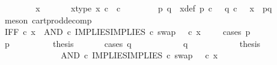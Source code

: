 \begin{isabellebody}
\ \ \isamarkupfalse%
{\isacharminus}{\kern0pt}\isanewline
\ \ \ \ \isamarkupfalse%
\ x\ \isanewline
\ \ \ \ \isamarkupfalse%
\ x{\isacharunderscore}{\kern0pt}type{\isacharcolon}{\kern0pt}\ {\isachardoublequoteopen}x\ {\isasymin}\isactrlsub c\ {\isasymOmega}\ {\isasymtimes}\isactrlsub c\ {\isasymOmega}{\isachardoublequoteclose}\isanewline
\ \ \ \ \isamarkupfalse%
\ \isamarkupfalse%
\ p\ q\ \ x{\isacharunderscore}{\kern0pt}def{\isacharcolon}{\kern0pt}\ {\isachardoublequoteopen}p\ {\isasymin}\isactrlsub c\ {\isasymOmega}\ {\isasymand}\ q\ {\isasymin}\isactrlsub c\ {\isasymOmega}\ {\isasymand}\ x\ {\isacharequal}{\kern0pt}\ {\isasymlangle}p{\isacharcomma}{\kern0pt}q{\isasymrangle}{\isachardoublequoteclose}\isanewline
\ \ \ \ \ \ \isamarkupfalse%
\ {\isacharparenleft}{\kern0pt}meson\ cart{\isacharunderscore}{\kern0pt}prod{\isacharunderscore}{\kern0pt}decomp{\isacharparenright}{\kern0pt}\isanewline
\ \ \ \ \isamarkupfalse%
\ {\isachardoublequoteopen}IFF\ {\isasymcirc}\isactrlsub c\ x\ {\isacharequal}{\kern0pt}\ {\isacharparenleft}{\kern0pt}AND\ {\isasymcirc}\isactrlsub c\ {\isasymlangle}IMPLIES{\isacharcomma}{\kern0pt}IMPLIES\ {\isasymcirc}\isactrlsub c\ swap\ {\isasymOmega}\ {\isasymOmega}{\isasymrangle}{\isacharparenright}{\kern0pt}\ {\isasymcirc}\isactrlsub c\ x{\isachardoublequoteclose}\isanewline
\ \ \ \ \isamarkupfalse%
{\isacharparenleft}{\kern0pt}cases\ {\isachardoublequoteopen}p\ {\isacharequal}{\kern0pt}\ {\isasymt}{\isachardoublequoteclose}{\isacharparenright}{\kern0pt}\isanewline
\ \ \ \ \ \ \isamarkupfalse%
\ {\isachardoublequoteopen}p\ {\isacharequal}{\kern0pt}\ {\isasymt}{\isachardoublequoteclose}\isanewline
\ \ \ \ \ \ \isamarkupfalse%
\ {\isacharquery}{\kern0pt}thesis\isanewline
\ \ \ \ \ \ \isamarkupfalse%
{\isacharparenleft}{\kern0pt}cases\ {\isachardoublequoteopen}q\ {\isacharequal}{\kern0pt}\ {\isasymt}{\isachardoublequoteclose}{\isacharparenright}{\kern0pt}\isanewline
\ \ \ \ \ \ \ \ \isamarkupfalse%
\ {\isachardoublequoteopen}q\ {\isacharequal}{\kern0pt}\ {\isasymt}{\isachardoublequoteclose}\isanewline
\ \ \ \ \ \ \ \ \isamarkupfalse%
\ {\isacharquery}{\kern0pt}thesis\isanewline
\ \ \ \ \ \ \ \ \isamarkupfalse%
\ {\isacharminus}{\kern0pt}\ \isanewline
\ \ \ \ \ \ \ \ \ \ \isamarkupfalse%
\ {\isachardoublequoteopen}{\isacharparenleft}{\kern0pt}AND\ {\isasymcirc}\isactrlsub c\ {\isasymlangle}IMPLIES{\isacharcomma}{\kern0pt}IMPLIES\ {\isasymcirc}\isactrlsub c\ swap\ {\isasymOmega}\ {\isasymOmega}{\isasymrangle}{\isacharparenright}{\kern0pt}\ {\isasymcirc}\isactrlsub c\ x\ {\isacharequal}{\kern0pt}\ \ \ \ \isanewline

\end{isabellebody}
